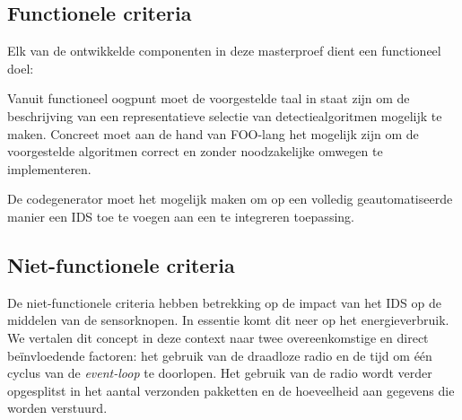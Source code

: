 \vspace{-3mm}

\subsection{Functionele criteria}

Elk van de ontwikkelde componenten in deze masterproef dient een functioneel
doel:

\begin{description}[noitemsep, topsep=0pt, partopsep=1pt]

  \item[Expressiviteit] Vanuit functioneel oogpunt moet de voorgestelde taal in
  staat zijn om de beschrijving van een representatieve selectie van
  detectiealgoritmen mogelijk te maken. Concreet moet aan de hand van FOO-lang
  het mogelijk zijn om de voorgestelde algoritmen correct en zonder
  noodzakelijke omwegen te implementeren.

  \item[Automatiseerbaarheid] De codegenerator moet het mogelijk maken om op
  een volledig geautomatiseerde manier een IDS toe te voegen aan een te
  integreren toepassing.

\end{description}

\vspace{-3mm}

\subsection{Niet-functionele criteria}

De niet-functionele criteria hebben betrekking op de impact van het IDS op de
middelen van de sensorknopen. In essentie komt dit neer op het energieverbruik.
We vertalen dit concept in deze context naar twee overeenkomstige en direct
be\"invloedende factoren: het gebruik van de draadloze radio en de tijd om
\'e\'en cyclus van de \emph{event-loop} te doorlopen. Het gebruik van de radio
wordt verder opgesplitst in het aantal verzonden pakketten en de hoeveelheid
aan gegevens die worden verstuurd.

